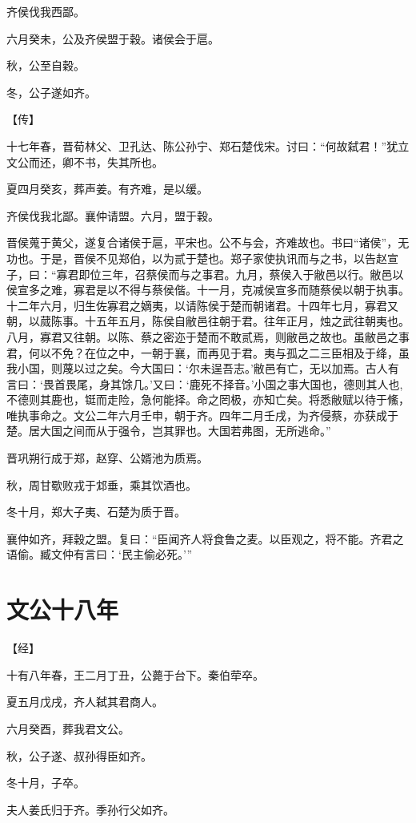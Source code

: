 \documentclass[a4paper,12pt,UTF8,twoside]{ctexbook}
\begin{document}
齐侯伐我西鄙。

六月癸未，公及齐侯盟于穀。诸侯会于扈。

秋，公至自穀。

冬，公子遂如齐。

【传】

十七年春，晋荀林父、卫孔达、陈公孙宁、郑石楚伐宋。讨曰：“何故弑君！”犹立文公而还，卿不书，失其所也。

夏四月癸亥，葬声姜。有齐难，是以缓。

齐侯伐我北鄙。襄仲请盟。六月，盟于穀。

晋侯蒐于黄父，遂复合诸侯于扈，平宋也。公不与会，齐难故也。书曰“诸侯”，无功也。于是，晋侯不见郑伯，以为贰于楚也。郑子家使执讯而与之书，以告赵宣子，曰：“寡君即位三年，召蔡侯而与之事君。九月，蔡侯入于敝邑以行。敝邑以侯宣多之难，寡君是以不得与蔡侯偕。十一月，克减侯宣多而随蔡侯以朝于执事。十二年六月，归生佐寡君之嫡夷，以请陈侯于楚而朝诸君。十四年七月，寡君又朝，以蒇陈事。十五年五月，陈侯自敝邑往朝于君。往年正月，烛之武往朝夷也。八月，寡君又往朝。以陈、蔡之密迩于楚而不敢贰焉，则敝邑之故也。虽敝邑之事君，何以不免？在位之中，一朝于襄，而再见于君。夷与孤之二三臣相及于绛，虽我小国，则蔑以过之矣。今大国曰：‘尔未逞吾志。’敝邑有亡，无以加焉。古人有言曰：‘畏首畏尾，身其馀几。’又曰：‘鹿死不择音。’小国之事大国也，德则其人也,不德则其鹿也，铤而走险，急何能择。命之罔极，亦知亡矣。将悉敝赋以待于鯈，唯执事命之。文公二年六月壬申，朝于齐。四年二月壬戌，为齐侵蔡，亦获成于楚。居大国之间而从于强令，岂其罪也。大国若弗图，无所逃命。”

晋巩朔行成于郑，赵穿、公婿池为质焉。

秋，周甘歜败戎于邥垂，乘其饮酒也。

冬十月，郑大子夷、石楚为质于晋。

襄仲如齐，拜穀之盟。复曰：“臣闻齐人将食鲁之麦。以臣观之，将不能。齐君之语偷。臧文仲有言曰：‘民主偷必死。’”


\section{文公十八年}


【经】

十有八年春，王二月丁丑，公薨于台下。秦伯荦卒。

夏五月戊戌，齐人弑其君商人。

六月癸酉，葬我君文公。

秋，公子遂、叔孙得臣如齐。

冬十月，子卒。

夫人姜氏归于齐。季孙行父如齐。
\end{document}

